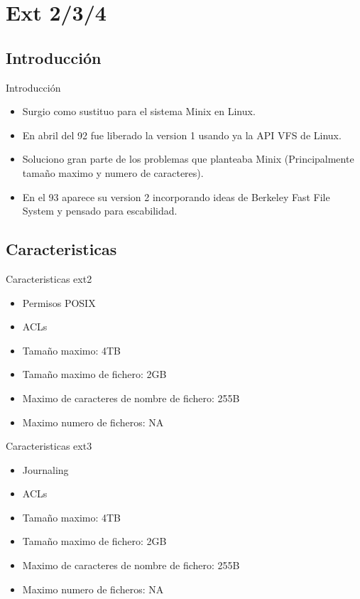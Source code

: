 \section{Ext 2/3/4}
\subsection{Introducción}
\begin{frame}{Introducción}
  \begin{itemize}
    \item Surgio como sustituo para el sistema Minix en Linux.
    \item En abril del 92 fue liberado la version 1 usando ya la API VFS de Linux.
    \item Soluciono gran parte de los problemas que planteaba Minix (Principalmente tamaño maximo y numero de caracteres).
    \item En el 93 aparece su version 2 incorporando ideas de Berkeley Fast File System y pensado para escabilidad.
  \end{itemize}
\end{frame}

\subsection{Caracteristicas}
\begin{frame}{Caracteristicas ext2}
  \begin{itemize}
    \item Permisos POSIX
    \item ACLs
    \item Tamaño maximo: 4TB
    \item Tamaño maximo de fichero: 2GB
    \item Maximo de caracteres de nombre de fichero: 255B
    \item Maximo numero de ficheros: NA
  \end{itemize}
\end{frame}

\begin{frame}{Caracteristicas ext3}
  \begin{itemize}
    \item Journaling
    \item ACLs
    \item Tamaño maximo: 4TB
    \item Tamaño maximo de fichero: 2GB
    \item Maximo de caracteres de nombre de fichero: 255B
    \item Maximo numero de ficheros: NA
  \end{itemize}
\end{frame}

